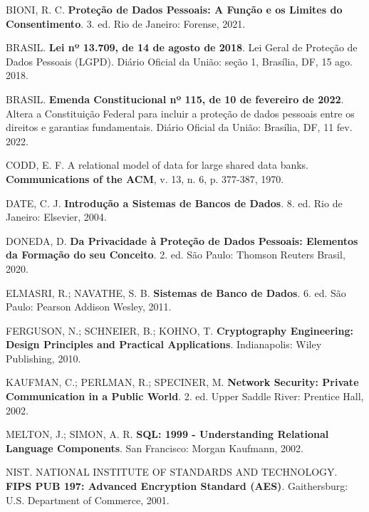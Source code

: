 \documentclass[12pt,a4paper]{article}
\begin{document}
\vspace{0.8em}
\noindent BIONI, R. C. \textbf{Proteção de Dados Pessoais: A Função e os Limites do Consentimento}. 3. ed. Rio de Janeiro: Forense, 2021.

\vspace{0.8em}
\noindent BRASIL. \textbf{Lei nº 13.709, de 14 de agosto de 2018}. Lei Geral de Proteção de Dados Pessoais (LGPD). Diário Oficial da União: seção 1, Brasília, DF, 15 ago. 2018.

\vspace{0.8em}
\noindent BRASIL. \textbf{Emenda Constitucional nº 115, de 10 de fevereiro de 2022}. Altera a Constituição Federal para incluir a proteção de dados pessoais entre os direitos e garantias fundamentais. Diário Oficial da União: Brasília, DF, 11 fev. 2022.

\vspace{0.8em}
\noindent CODD, E. F. A relational model of data for large shared data banks. \textbf{Communications of the ACM}, v. 13, n. 6, p. 377-387, 1970.

\vspace{0.8em}
\noindent DATE, C. J. \textbf{Introdução a Sistemas de Bancos de Dados}. 8. ed. Rio de Janeiro: Elsevier, 2004.

\vspace{0.8em}
\noindent DONEDA, D. \textbf{Da Privacidade à Proteção de Dados Pessoais: Elementos da Formação do seu Conceito}. 2. ed. São Paulo: Thomson Reuters Brasil, 2020.

\vspace{0.8em}
\noindent ELMASRI, R.; NAVATHE, S. B. \textbf{Sistemas de Banco de Dados}. 6. ed. São Paulo: Pearson Addison Wesley, 2011.

\vspace{0.8em}
\noindent FERGUSON, N.; SCHNEIER, B.; KOHNO, T. \textbf{Cryptography Engineering: Design Principles and Practical Applications}. Indianapolis: Wiley Publishing, 2010.

\vspace{0.8em}
\noindent KAUFMAN, C.; PERLMAN, R.; SPECINER, M. \textbf{Network Security: Private Communication in a Public World}. 2. ed. Upper Saddle River: Prentice Hall, 2002.

\vspace{0.8em}
\noindent MELTON, J.; SIMON, A. R. \textbf{SQL: 1999 - Understanding Relational Language Components}. San Francisco: Morgan Kaufmann, 2002.

\vspace{0.8em}
\noindent NIST. NATIONAL INSTITUTE OF STANDARDS AND TECHNOLOGY. \textbf{FIPS PUB 197: Advanced Encryption Standard (AES)}. Gaithersburg: U.S. Department of Commerce, 2001.
\end{document}
